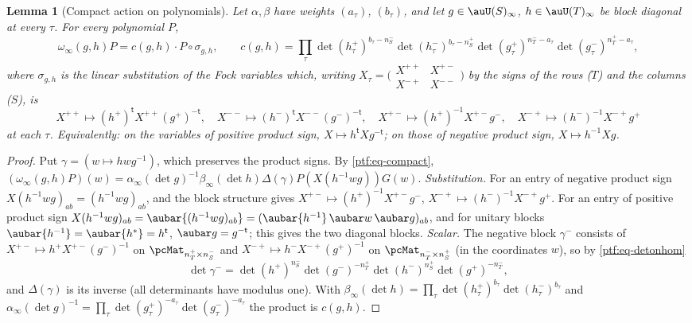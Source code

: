 \documentclass[10pt]{amsart}
\newtheorem{lemma}[theorem]{Lemma}
\theoremstyle{definition}
\theoremstyle{remark}
\begin{document}
\begin{lemma}[Compact action on polynomials]\label{ptf:fock}
Let $\alpha,\beta$ have weights $(a_\tau)$, $(b_\tau)$, and let $g\in\auU(S)_\infty$, $h\in\auU(T)_\infty$ be
block diagonal at every $\tau$. For every polynomial $P$,
\[
\omega_\infty(g,h)P=c(g,h)\cdot P\circ\sigma_{g,h},\qquad c(g,h)=\prod_\tau\det(h^+_\tau)^{b_\tau-n_S^-}
\det(h^-_\tau)^{b_\tau-n_S^+}\det(g^+_\tau)^{n_T^--a_\tau}\det(g^-_\tau)^{n_T^+-a_\tau},
\]
where $\sigma_{g,h}$ is the linear substitution of the Fock variables which, writing $X_\tau=
\bigl(\begin{smallmatrix}X^{++}&X^{+-}\\X^{-+}&X^{--}\end{smallmatrix}\bigr)$ by the signs of the rows ($T$) and the
columns ($S$), is
\[
X^{++}\mapsto(h^+)^{\mathsf t}X^{++}(g^+)^{-\mathsf t},\quad X^{--}\mapsto(h^-)^{\mathsf t}X^{--}(g^-)^{-\mathsf t},
\quad X^{+-}\mapsto(h^+)^{-1}X^{+-}g^-,\quad X^{-+}\mapsto(h^-)^{-1}X^{-+}g^+
\]
at each $\tau$. Equivalently: on the variables of positive product sign, $X\mapsto h^{\mathsf t}Xg^{-\mathsf t}$; on
those of negative product sign, $X\mapsto h^{-1}Xg$.
\end{lemma}
\begin{proof}
Put $\gamma=(w\mapsto hwg^{-1})$, which preserves the product signs. By \eqref{ptf:eq-compact},
$(\omega_\infty(g,h)P)(w)=\alpha_\infty(\det g)^{-1}\allowbreak \beta_\infty(\det h)\allowbreak \Delta(\gamma)\allowbreak P(X(h^{-1}wg))\allowbreak G(w)$.
\emph{Substitution.} For an entry of negative product sign $X(h^{-1}wg)_{ab}=(h^{-1}wg)_{ab}$, and the
block structure gives $X^{+-}\mapsto(h^+)^{-1}X^{+-}g^-$, $X^{-+}\mapsto(h^-)^{-1}X^{-+}g^+$. For an entry of positive
product sign $X(h^{-1}wg)_{ab}=\aubar{(h^{-1}wg)_{ab}}=(\aubar{h^{-1}}\,\aubar w\,\aubar g)_{ab}$, and for unitary
blocks $\aubar{h^{-1}}=\aubar{h^*}=h^{\mathsf t}$, $\aubar g=g^{-\mathsf t}$; this gives the two diagonal blocks.
\emph{Scalar.} The negative block $\gamma^-$ consists of $X^{+-}\mapsto h^+X^{+-}(g^-)^{-1}$ on
$\pcMat_{n_T^+\times n_S^-}$ and $X^{-+}\mapsto h^-X^{-+}(g^+)^{-1}$ on $\pcMat_{n_T^-\times n_S^+}$ (in the coordinates
$w$), so by \eqref{ptf:eq-detonhom}
\[
\det\gamma^-=\det(h^+)^{n_S^-}\det(g^-)^{-n_T^+}\det(h^-)^{n_S^+}\det(g^+)^{-n_T^-},
\]
and $\Delta(\gamma)$ is its inverse (all determinants have modulus one). With $\beta_\infty(\det h)=\prod_\tau
\det(h^+_\tau)^{b_\tau}\det(h^-_\tau)^{b_\tau}$ and $\alpha_\infty(\det g)^{-1}=\prod_\tau\det(g^+_\tau)^{-a_\tau}\det(g^-_\tau)^{-a_\tau}$
the product is $c(g,h)$.
\end{proof}
\end{document}
